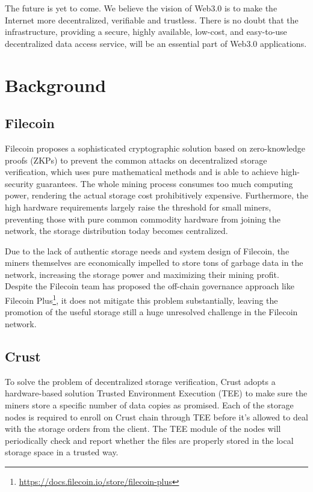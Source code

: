 \documentclass[]{article}
\begin{document}
The future is yet to come. We believe the vision of Web3.0 is to make the Internet more decentralized, verifiable and trustless. There is no doubt that the infrastructure, providing a secure, highly available, low-cost, and easy-to-use decentralized data access service, will be an essential part of Web3.0 applications.

\section{Background}

\subsection{Filecoin}

Filecoin\cite{filecoin} proposes a sophisticated cryptographic solution based on zero-knowledge proofs (ZKPs) to prevent the common attacks on decentralized storage verification, which uses pure mathematical methods and is able to achieve high-security guarantees. The whole mining process consumes too much computing power, rendering the actual storage cost prohibitively expensive. Furthermore, the high hardware requirements largely raise the threshold for small miners, preventing those with pure common commodity hardware from joining the network, the storage distribution today becomes centralized.

Due to the lack of authentic storage needs and system design of Filecoin, the miners themselves are economically impelled to store tons of garbage data in the network, increasing the storage power and maximizing their mining profit. Despite the Filecoin team has proposed the off-chain governance approach like Filecoin Plus\footnote{\url{https://docs.filecoin.io/store/filecoin-plus}}, it does not mitigate this problem substantially, leaving the promotion of the useful storage still a huge unresolved challenge in the Filecoin network.

\subsection{Crust}

To solve the problem of decentralized storage verification, Crust\cite{crust} adopts a hardware-based solution Trusted Environment Execution (TEE) to make sure the miners store a specific number of data copies as promised. Each of the storage nodes is required to enroll on Crust chain through TEE before it's allowed to deal with the storage orders from the client. The TEE module of the nodes will periodically check and report whether the files are properly stored in the local storage space in a trusted way.
\end{document}
